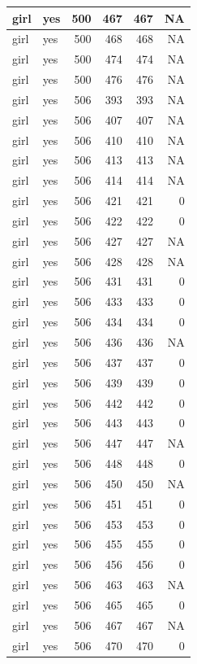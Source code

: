 \documentclass[man]{apa6}
\begin{document}
\begin{tabular}{l|l|r|r|r|r}
\hline
girl & yes & 500 & 467 & 467 & NA\\
\hline
girl & yes & 500 & 468 & 468 & NA\\
\hline
girl & yes & 500 & 474 & 474 & NA\\
\hline
girl & yes & 500 & 476 & 476 & NA\\
\hline
girl & yes & 506 & 393 & 393 & NA\\
\hline
girl & yes & 506 & 407 & 407 & NA\\
\hline
girl & yes & 506 & 410 & 410 & NA\\
\hline
girl & yes & 506 & 413 & 413 & NA\\
\hline
girl & yes & 506 & 414 & 414 & NA\\
\hline
girl & yes & 506 & 421 & 421 & 0\\
\hline
girl & yes & 506 & 422 & 422 & 0\\
\hline
girl & yes & 506 & 427 & 427 & NA\\
\hline
girl & yes & 506 & 428 & 428 & NA\\
\hline
girl & yes & 506 & 431 & 431 & 0\\
\hline
girl & yes & 506 & 433 & 433 & 0\\
\hline
girl & yes & 506 & 434 & 434 & 0\\
\hline
girl & yes & 506 & 436 & 436 & NA\\
\hline
girl & yes & 506 & 437 & 437 & 0\\
\hline
girl & yes & 506 & 439 & 439 & 0\\
\hline
girl & yes & 506 & 442 & 442 & 0\\
\hline
girl & yes & 506 & 443 & 443 & 0\\
\hline
girl & yes & 506 & 447 & 447 & NA\\
\hline
girl & yes & 506 & 448 & 448 & 0\\
\hline
girl & yes & 506 & 450 & 450 & NA\\
\hline
girl & yes & 506 & 451 & 451 & 0\\
\hline
girl & yes & 506 & 453 & 453 & 0\\
\hline
girl & yes & 506 & 455 & 455 & 0\\
\hline
girl & yes & 506 & 456 & 456 & 0\\
\hline
girl & yes & 506 & 463 & 463 & NA\\
\hline
girl & yes & 506 & 465 & 465 & 0\\
\hline
girl & yes & 506 & 467 & 467 & NA\\
\hline
girl & yes & 506 & 470 & 470 & 0\\

\end{tabular}
\end{document}
